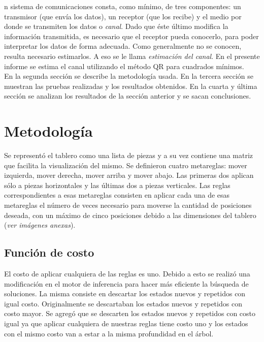 \documentclass[10pt,journal,compsoc]{IEEEtran}
\begin{document}
% 
% 
% 
% 
n sistema de comunicaciones consta, como m\'inimo, de tres componentes: un transmisor (que env\'ia los datos), un receptor (que los recibe) y el medio por donde se transmiten los datos o \textit{canal}. Dado que \'este \'ultimo modifica la informaci\'on transmitida, es necesario que el receptor pueda conocerlo, para poder interpretar los datos de forma adecuada. Como generalmente no se conocen, resulta necesario estimarlos. A eso se le llama \textit{estimaci\'on del canal}. En el presente informe se estima el canal utilizando el m\'etodo QR para cuadrados m\'inimos.\\
En la segunda secci\'on se describe la metodolog\'ia usada.
En la tercera secci\'on se muestran las pruebas realizadas y los resultados obtenidos.
En la cuarta y \'ultima secci\'on se analizan los resultados de la secci\'on anterior y se sacan conclusiones.

\section{Metodolog\'ia}
Se represent\'o el tablero como una lista de piezas y a su vez contiene una matriz que facilita la visualizaci\'on del mismo.
Se definieron cuatro metareglas: mover izquierda, mover derecha, mover arriba y mover abajo. Las primeras dos aplican s\'olo a piezas horizontales y las \'ultimas dos a piezas verticales.
Las reglas correspondientes a esas metareglas consisten en aplicar cada una de esas metareglas el n\'umero de veces necesario para moverse la cantidad de posiciones deseada, con un m\'aximo de cinco posiciones debido a las dimensiones del tablero (\textit{ver im\'agenes anexas}).

\subsection{Funci\'on de costo}
El costo de aplicar cualquiera de las reglas es uno.
Debido a esto se realiz\'o una modificaci\'on en el motor de inferencia para hacer m\'as eficiente la b\'usqueda de soluciones. La misma consiste en descartar los estados nuevos y repetidos con igual costo. Originalmente se descartaban los estados nuevos y repetidos con costo mayor. Se agreg\'o que se descarten los estados nuevos y repetidos con costo igual ya que aplicar cualquiera de nuestras reglas tiene costo uno y los estados con el mismo costo van a estar a la misma profundidad en el \'arbol.
\end{document}
